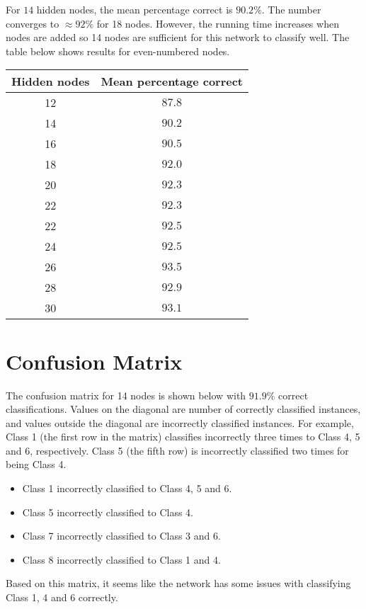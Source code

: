 \documentclass{article}
\begin{document}
\noindent For $14$ hidden nodes, the mean percentage correct is $90.2\%$. The number converges to $\approx 92\%$ for 18 nodes. However, the running time increases when nodes are added so 14 nodes are sufficient for this network to classify well. The table below shows results for even-numbered nodes.

\begin{center}
\begin{tabular}{cc}
\toprule
Hidden nodes & Mean percentage correct \\
\midrule
12 & $87.8$\\
14 & $90.2$\\
16 & $90.5$\\
18 & $92.0$\\
20 & $92.3$\\
22 & $92.3$\\
22 & $92.5$\\
24 & $92.5$\\
26 & $93.5$\\
28 & $92.9$\\
30 & $93.1$\\
\bottomrule
\end{tabular}
\end{center}

\section*{Confusion Matrix}

\noindent The confusion matrix for 14 nodes is shown below with $91.9\%$ correct classifications. Values on the diagonal are number of correctly classified instances, and values outside the diagonal are incorrectly classified instances. For example, Class 1 (the first row in the matrix) classifies incorrectly three times to Class 4, 5 and 6, respectively. Class 5 (the fifth row) is incorrectly classified two times for being Class 4.

\begin{itemize}
    \item Class 1 incorrectly classified to Class 4, 5 and 6.
    \item Class 5 incorrectly classified to Class 4.
    \item Class 7 incorrectly classified to Class 3 and 6.
    \item Class 8 incorrectly classified to Class 1 and 4.
\end{itemize}

\noindent Based on this matrix, it seems like the network has some issues with classifying Class 1, 4 and 6 correctly.
\end{document}
